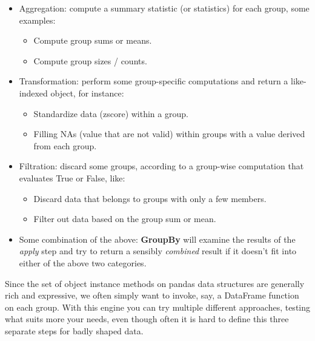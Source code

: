 \begin{itemize}
    \item Aggregation: compute a summary statistic (or statistics) for each group, some examples:
          \begin{itemize}
              \item Compute group sums or means.
              \item Compute group sizes / counts.
          \end{itemize}
    \item Transformation: perform some group-specific computations and return a like-indexed object, for instance:
          \begin{itemize}
              \item Standardize data (zscore) within a group.
              \item Filling NAs (value that are not valid) within groups with a value derived from each group.
          \end{itemize}
    \item Filtration: discard some groups, according to a group-wise computation that evaluates True or False, like:
          \begin{itemize}
              \item Discard data that belongs to groups with only a few members.
              \item Filter out data based on the group sum or mean.
          \end{itemize}
    \item Some combination of the above: \textbf{GroupBy} will examine the results of the \textit{apply} step and try to return a  sensibly \textit{combined} result if it doesn't fit into either of the above two categories.
\end{itemize}
Since the set of object instance methods on pandas data structures are generally rich and expressive, we often simply want to invoke, say, a DataFrame function on each group.
With this engine you can try multiple different approaches, testing what suits more your needs, even though often it is hard to define this three separate steps for badly shaped data.

